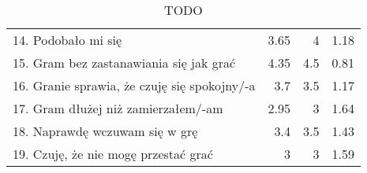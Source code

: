 \begin{table}[h!]
\begin{center}
\begin{tabular}{|m{10em}|r|r|r|}
            14. Podobało mi się                                               & 3.65          & 4       & 1.18           \\
            15. Gram bez zastanawiania się jak grać                           & 4.35          & 4.5     & 0.81           \\
            16. Granie sprawia, \newline że czuję się spokojny/-a             & 3.7           & 3.5     & 1.17           \\
            17. Gram dłużej \newline niż zamierzałem/-am                      & 2.95          & 3       & 1.64           \\
            18. Naprawdę wczuwam się w grę                                    & 3.4           & 3.5     & 1.43           \\
            19. Czuję, że nie mogę przestać grać                              & 3             & 3       & 1.59           \\
            \hline
        \end{tabular}
    \end{center}
    \caption{TODO}\label{tab1:ch7_9}
\end{table}

